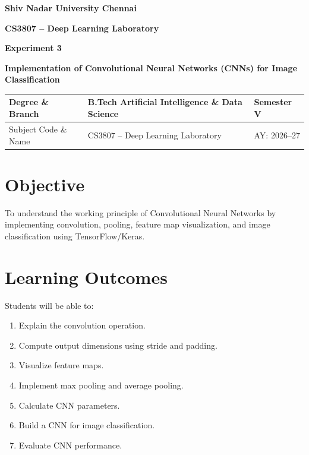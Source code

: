 \documentclass[11pt]{article}
\begin{document}
\begin{center}
\Large\textbf{Shiv Nadar University Chennai}\\
\end{center}


\begin{center}
\textbf{CS3807 – Deep Learning Laboratory}
\vspace{2mm}

\textbf{Experiment 3}
\vspace{2mm}

\textbf{Implementation of Convolutional Neural Networks (CNNs) for Image Classification}
\end{center}


\renewcommand{\arraystretch}{1.4}

\begin{tabular}{|p{3.5cm}|p{8cm}|p{2cm}|}
\hline
Degree \& Branch & B.Tech Artificial Intelligence \& Data Science & Semester V\\ \hline
Subject Code \& Name & CS3807 -- Deep Learning Laboratory & AY: 2026--27\\ \hline
\end{tabular}
\vspace{3mm}

\section{Objective}
To understand the working principle of Convolutional Neural Networks by implementing convolution, pooling, feature map visualization, and image classification using TensorFlow/Keras.

\section{Learning Outcomes}
Students will be able to:
\begin{enumerate}[leftmargin=*]
    \item Explain the convolution operation.
    \item Compute output dimensions using stride and padding.
    \item Visualize feature maps.
    \item Implement max pooling and average pooling.
    \item Calculate CNN parameters.
    \item Build a CNN for image classification.
    \item Evaluate CNN performance.
\end{enumerate}
\end{document}
